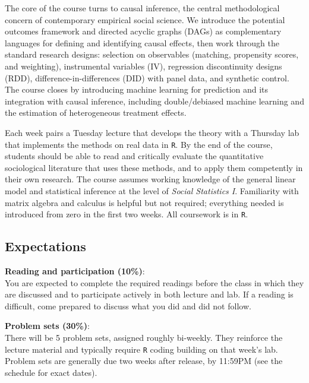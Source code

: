 \documentclass[12pt]{article}
\begin{document}
The core of the course turns to causal inference, the central methodological concern of contemporary empirical social science. We introduce the potential outcomes framework and directed acyclic graphs (DAGs) as complementary languages for defining and identifying causal effects, then work through the standard research designs: selection on observables (matching, propensity scores, and weighting), instrumental variables (IV), regression discontinuity designs (RDD), difference-in-differences (DID) with panel data, and synthetic control. The course closes by introducing machine learning for prediction and its integration with causal inference, including double/debiased machine learning and the estimation of heterogeneous treatment effects.

Each week pairs a Tuesday lecture that develops the theory with a Thursday lab that implements the methods on real data in \texttt{R}. By the end of the course, students should be able to read and critically evaluate the quantitative sociological literature that uses these methods, and to apply them competently in their own research. The course assumes working knowledge of the general linear model and statistical inference at the level of \textit{Social Statistics I}. Familiarity with matrix algebra and calculus is helpful but not required; everything needed is introduced from zero in the first two weeks. All coursework is in \texttt{R}.

\subsection*{Expectations}

\textbf{\textcolor{titlecolor}{Reading and participation (10\%)}}:\\
You are expected to complete the required readings before the class in which they are discussed and to participate actively in both lecture and lab. If a reading is difficult, come prepared to discuss what you did and did not follow.

\vspace{0.5em}

\noindent \textbf{\textcolor{titlecolor}{Problem sets (30\%)}}:\\
There will be 5 problem sets, assigned roughly bi-weekly. They reinforce the lecture material and typically require \texttt{R} coding building on that week's lab. Problem sets are generally due two weeks after release, by 11:59PM (see the schedule for exact dates).

\vspace{0.5em}
\end{document}
